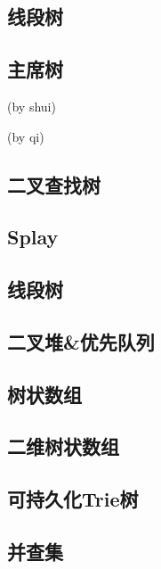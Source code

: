 \documentclass{ctexart}
\begin{document}
\subsection{线段树}

\subsection{主席树}
(by shui)

(by qi)

\subsection{二叉查找树}

\subsection{Splay}


\subsection{线段树}

\subsection{二叉堆\&优先队列}

\subsection{树状数组} %

\subsection{二维树状数组} %

\subsection{可持久化Trie树} %

\subsection{并查集} %

\end{document}
